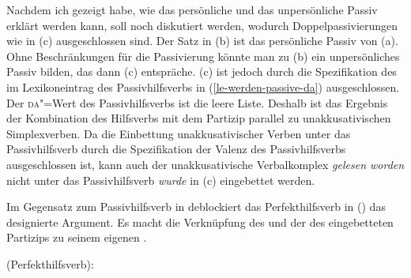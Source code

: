 Nachdem ich gezeigt habe, wie das persönliche und das unpersönliche Passiv erklärt werden
kann, soll noch diskutiert werden, wodurch Doppelpassivierungen wie in (c) ausgeschlossen sind.
\eal
\label{ex-double-application-of-passive}
\zl
Der Satz in (b) ist das persönliche Passiv von (a). Ohne Beschränkungen
für die Passivierung könnte man zu (b) ein unpersönliches Passiv bilden, das dann (c)
entspräche. (c) ist jedoch durch die Spezifikation des \dawes im Lexikoneintrag
des Passivhilfsverbs in (\ref{le-werden-passive-da}) ausgeschlossen. Der \textsc{da}"=Wert des Passivhilfsverbs
ist die leere Liste. Deshalb ist das Ergebnis der Kombination des Hilfsverbs mit dem Partizip parallel
zu unakkusativischen Simplexverben. Da die Einbettung unakkusativischer Verben unter das
Passivhilfsverb durch die Spezifikation der Valenz des Passivhilfsverbs ausgeschlossen ist,
kann auch der unakkusativische Verbalkomplex \emph{gelesen worden} nicht unter 
das Passivhilfsverb \emph{wurde} in (c) eingebettet werden.

Im Gegensatz zum Passivhilfsverb in 
deblockiert das Perfekthilfsverb in () das designierte Argument.
Es macht die Verknüpfung des \subjwes und der \compsl des eingebetteten Partizips
zu seinem eigenen \argstw.

\eas
\label{le-haben-perfekt}%
\mbox{\haben (Perfekthilfsverb):}\\
\zs

